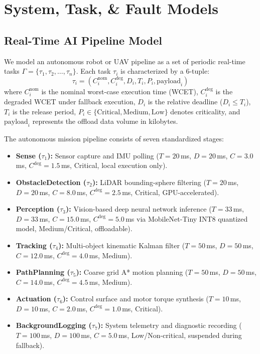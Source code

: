 \documentclass[10pt,conference]{IEEEtran}
\begin{document}
\section{System, Task, \& Fault Models}
\label{sec:models}

\subsection{Real-Time AI Pipeline Model}
We model an autonomous robot or UAV pipeline as a set of periodic real-time tasks $\Gamma = \{\tau_1, \tau_2, \dots, \tau_n\}$. Each task $\tau_i$ is characterized by a 6-tuple:
\begin{equation}
    \tau_i = \left( C_i^{\text{nom}}, C_i^{\text{deg}}, D_i, T_i, P_i, \text{payload}_i \right)
\end{equation}
where $C_i^{\text{nom}}$ is the nominal worst-case execution time (WCET), $C_i^{\text{deg}}$ is the degraded WCET under fallback execution, $D_i$ is the relative deadline ($D_i \le T_i$), $T_i$ is the release period, $P_i \in \{\text{Critical}, \text{Medium}, \text{Low}\}$ denotes criticality, and $\text{payload}_i$ represents the offload data volume in kilobytes.

The autonomous mission pipeline consists of seven standardized stages:
\begin{itemize}
    \item \textbf{Sense ($\tau_1$):} Sensor capture and IMU polling ($T=20$\,ms, $D=20$\,ms, $C=3.0$\,ms, $C^{\text{deg}}=1.5$\,ms, Critical, local execution only).
    \item \textbf{ObstacleDetection ($\tau_2$):} LiDAR bounding-sphere filtering ($T=20$\,ms, $D=20$\,ms, $C=8.0$\,ms, $C^{\text{deg}}=2.5$\,ms, Critical, GPU-accelerated).
    \item \textbf{Perception ($\tau_3$):} Vision-based deep neural network inference ($T=33$\,ms, $D=33$\,ms, $C=15.0$\,ms, $C^{\text{deg}}=5.0$\,ms via MobileNet-Tiny INT8 quantized model, Medium/Critical, offloadable).
    \item \textbf{Tracking ($\tau_4$):} Multi-object kinematic Kalman filter ($T=50$\,ms, $D=50$\,ms, $C=12.0$\,ms, $C^{\text{deg}}=4.0$\,ms, Medium).
    \item \textbf{PathPlanning ($\tau_5$):} Coarse grid A* motion planning ($T=50$\,ms, $D=50$\,ms, $C=14.0$\,ms, $C^{\text{deg}}=4.5$\,ms, Medium).
    \item \textbf{Actuation ($\tau_6$):} Control surface and motor torque synthesis ($T=10$\,ms, $D=10$\,ms, $C=2.0$\,ms, $C^{\text{deg}}=1.0$\,ms, Critical).
    \item \textbf{BackgroundLogging ($\tau_7$):} System telemetry and diagnostic recording ($T=100$\,ms, $D=100$\,ms, $C=5.0$\,ms, Low/Non-critical, suspended during fallback).
\end{itemize}
\end{document}

